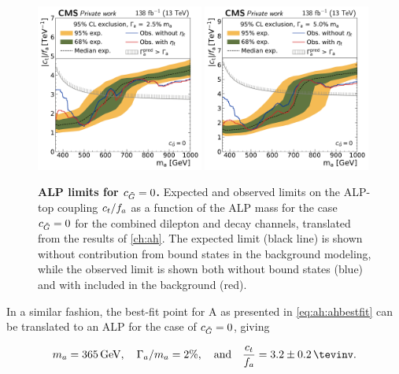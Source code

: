 \begin{figure}[t]
    \centering
    \includegraphics[width=0.49\textwidth]{figures/alps/A_limit_w2p5_g-scan_alp_lx.pdf}
    \hfill
    \includegraphics[width=0.49\textwidth]{figures/alps/A_limit_w5p0_g-scan_alp_lx.pdf}
    \caption{
        \textbf{ALP limits for $c_{\tilde{G}} = 0$.} Expected and observed limits on the ALP-top coupling $c_t / f_a$ as a function of the ALP mass for the case $c_{\tilde{G}} = 0$ for the combined dilepton and \ljets decay channels, translated from the results of \cref{ch:ah}. The expected limit (black line) is shown without contribution from \ttbar bound states in the background modeling, while the observed limit is shown both without \ttbar bound states (blue) and with \etat included in the background (red).
    }
    \label{fig:alps:translation}
\end{figure}

In a similar fashion, the best-fit point for A as presented in \cref{eq:ah:ahbestfit} can be translated to an ALP for the case of $c_{\tilde{G}} = 0$, giving

\begin{equation*}
    m_a = \SI{365}{\GeV}, \quad \Gamma_a / m_a = 2\%, \quad \text{and} \quad \frac{\ct}{f_a} = 3.2 \pm 0.2 \, \si{\tevinv}.
\end{equation*}

